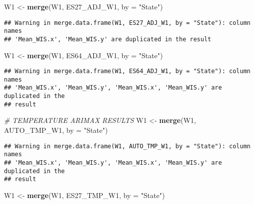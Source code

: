 \documentclass[
]{article}
\newenvironment{Shaded}{\begin{snugshade}}{\end{snugshade}}
\newcommand{\AttributeTok}[1]{\textcolor[rgb]{0.13,0.29,0.53}{#1}}
\newcommand{\CommentTok}[1]{\textcolor[rgb]{0.56,0.35,0.01}{\textit{#1}}}
\newcommand{\FunctionTok}[1]{\textcolor[rgb]{0.13,0.29,0.53}{\textbf{#1}}}
\newcommand{\NormalTok}[1]{#1}
\newcommand{\OtherTok}[1]{\textcolor[rgb]{0.56,0.35,0.01}{#1}}
\newcommand{\StringTok}[1]{\textcolor[rgb]{0.31,0.60,0.02}{#1}}
\begin{document}
\begin{Shaded}
\begin{Highlighting}[]
\NormalTok{W1 }\OtherTok{\textless{}{-}} \FunctionTok{merge}\NormalTok{(W1, ES27\_ADJ\_W1, }\AttributeTok{by =} \StringTok{"State"}\NormalTok{)}
\end{Highlighting}
\end{Shaded}

\begin{verbatim}
## Warning in merge.data.frame(W1, ES27_ADJ_W1, by = "State"): column names
## 'Mean_WIS.x', 'Mean_WIS.y' are duplicated in the result
\end{verbatim}

\begin{Shaded}
\begin{Highlighting}[]
\NormalTok{W1 }\OtherTok{\textless{}{-}} \FunctionTok{merge}\NormalTok{(W1, ES64\_ADJ\_W1, }\AttributeTok{by =} \StringTok{"State"}\NormalTok{)}
\end{Highlighting}
\end{Shaded}

\begin{verbatim}
## Warning in merge.data.frame(W1, ES64_ADJ_W1, by = "State"): column names
## 'Mean_WIS.x', 'Mean_WIS.y', 'Mean_WIS.x', 'Mean_WIS.y' are duplicated in the
## result
\end{verbatim}

\begin{Shaded}
\begin{Highlighting}[]
\CommentTok{\# TEMPERATURE ARIMAX RESULTS}
\NormalTok{W1 }\OtherTok{\textless{}{-}} \FunctionTok{merge}\NormalTok{(W1, AUTO\_TMP\_W1, }\AttributeTok{by =} \StringTok{"State"}\NormalTok{)}
\end{Highlighting}
\end{Shaded}

\begin{verbatim}
## Warning in merge.data.frame(W1, AUTO_TMP_W1, by = "State"): column names
## 'Mean_WIS.x', 'Mean_WIS.y', 'Mean_WIS.x', 'Mean_WIS.y' are duplicated in the
## result
\end{verbatim}

\begin{Shaded}
\begin{Highlighting}[]
\NormalTok{W1 }\OtherTok{\textless{}{-}} \FunctionTok{merge}\NormalTok{(W1, ES27\_TMP\_W1, }\AttributeTok{by =} \StringTok{"State"}\NormalTok{)}
\end{Highlighting}
\end{Shaded}
\end{document}
